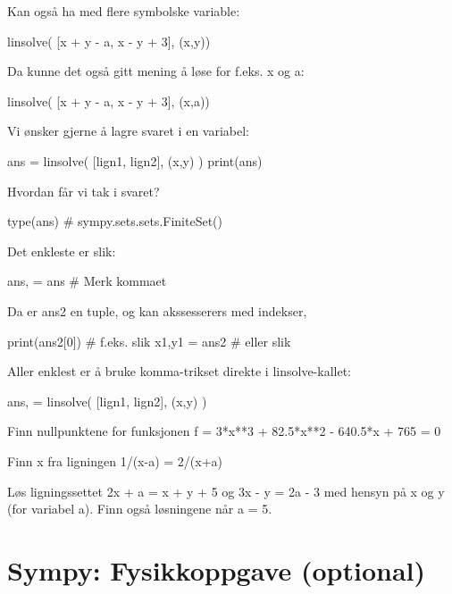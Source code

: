 Kan også ha med flere symbolske variable: 
\begin{usncodebox}
linsolve( [x + y - a, x - y + 3], (x,y))
\end{usncodebox}

Da kunne det også gitt mening å løse for f.eks. x og a:
\begin{usncodebox}
linsolve( [x + y - a, x - y + 3], (x,a))
\end{usncodebox}

Vi ønsker gjerne å lagre svaret i en variabel:
\begin{usncodebox}
ans = linsolve( [lign1, lign2], (x,y) )  
print(ans)
\end{usncodebox}

Hvordan får vi tak i svaret?
\begin{usncodebox}
type(ans)     # sympy.sets.sets.FiniteSet()
\end{usncodebox}

Det enkleste er slik:
\begin{usncodebox}
ans, = ans    # Merk kommaet
\end{usncodebox}

Da er ans2 en tuple, og kan akssesserers med indekser,
\begin{usncodebox}
print(ans2[0])  # f.eks. slik
x1,y1 = ans2    # eller slik 
\end{usncodebox}

Aller enklest er å bruke komma-trikset direkte i linsolve-kallet: 
\begin{usncodebox}
ans, = linsolve( [lign1, lign2], (x,y) )  
\end{usncodebox}

\begin{exercise}
Finn nullpunktene for funksjonen f = 3*x**3 + 82.5*x**2 - 640.5*x + 765 = 0
\end{exercise}

\begin{exercise}
Finn x fra ligningen   1/(x-a) = 2/(x+a)
\end{exercise}

\begin{exercise}
Løs ligningssettet 2x + a = x + y + 5  og  3x - y = 2a - 3  med hensyn på x og y (for variabel a).
Finn også løsningene når a = 5. 
\end{exercise}

\section{Sympy: Fysikkoppgave (optional)}

